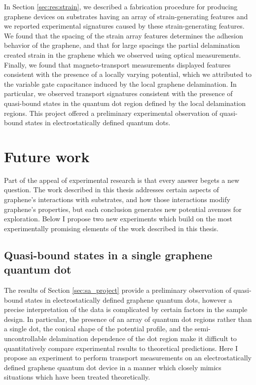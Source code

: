 \documentclass[edeposit,fullpage,draftthesis]{uiucthesis2009}
\begin{document}
            In Section \ref{sec:res:strain}, we described a fabrication procedure for producing graphene devices on
            substrates having an array of strain-generating features and we reported experimental signatures
            caused by these strain-generating features. We found that the spacing of the strain array features
            determines the adhesion behavior of the graphene, and that for large spacings the partial
            delamination created strain in the graphene which we observed using optical measurements. 
            Finally, we found that magneto-transport measurements
            displayed features consistent with the presence of a locally varying potential, which we attributed to the 
            variable gate capacitance induced by the local graphene delamination. In particular, we observed
            transport signatures consistent with the presence of quasi-bound states in the quantum
            dot region defined by the local delamination regions. This project offered a preliminary 
            experimental observation of quasi-bound states in electrostatically defined quantum dots.
            
   
    \section{Future work}
    \label{sec:fw}
    
        Part of the appeal of experimental research is that every answer begets a new question.
        The work described in this thesis addresses certain aspects of graphene's interactions with
        substrates, and how those interactions modify graphene's properties, but each conclusion
        generates new potential avenues for exploration.
        Below I propose two new experiments which build on the most experimentally promising elements
        of the work described in this thesis. 
    
        \subsection{Quasi-bound states in a single graphene quantum dot}
        
        The results of Section \ref{sec:sa_project} provide a preliminary observation of quasi-bound states
        in electrostatically defined graphene quantum dots, however a precise interpretation of the data is complicated 
        by certain factors in the sample design. In particular, the presence of an array of 
        quantum dot regions rather than a single dot, the conical shape of the potential profile,
        and the semi-uncontrollable delamination dependence of the dot region make it difficult to 
        quantitatively compare experimental results to theoretical predictions. Here I propose an
        experiment to perform transport measurements on an electrostatically defined graphene 
        quantum dot device in a manner which closely mimics situations which have been treated theoretically.
        
\end{document}
